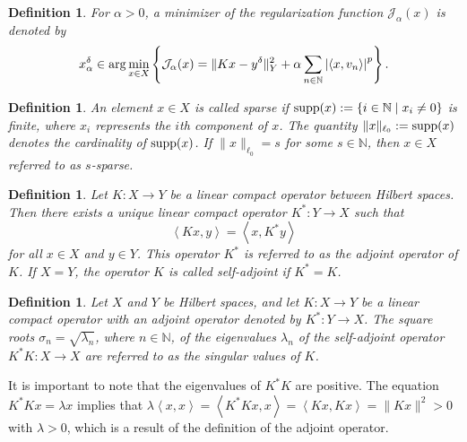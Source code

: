 \documentclass[a4paper,12pt]{article}
\newtheorem{definition}[theorem]{Definition}
\numberwithin{equation}{section}
\begin{document}
\begin{definition}\label{def2.1}
    For $\alpha>0$, a minimizer of the regularization function $\mathcal{J}_{\alpha}(x)$ is denoted by
    \begin{equation*}
    x_{\alpha}^{\delta}\in {\rm arg}\min_{x\in X}\left\{\mathcal{J}_{\alpha}(x)= \|Kx-y^{\delta}\|_{Y}^{2}+\alpha\sum_{n\in\mathbb{N}}\left|\left<x,v_{n}\right>\right|^{p}\right\}.
    \end{equation*}
\end{definition}

\begin{definition}\label{def2.2}
    An element $x\in X$ is called sparse if ${\rm supp}(x):=\left\{i\in\mathbb{N} \mid x_{i}\neq 0\right\}$ is finite, where $x_{i}$ represents the $i${\rm th} component of $x$. The quantity $\|x\|_{\ell_{0}}:={\rm supp}(x)$ denotes the cardinality of ${\rm supp}(x)$. If $\|x\|_{\ell_{0}}=s$ for some $s\in\mathbb{N}$, then $x\in X$ referred to as $s$-sparse.
\end{definition}

\begin{definition}\label{def2.3}
    Let $K:X\rightarrow Y$ be a linear compact operator between Hilbert spaces. Then there exists a unique linear compact operator $K^{*}:Y\rightarrow X$ such that
    \begin{equation*}
        \left<Kx,y\right>=\left<x,K^{*}y\right>
    \end{equation*}
    for all $x\in X$ and $y\in Y$. This operator $K^{*}$ is referred to as the adjoint operator of $K$. If $X=Y$, the operator $K$ is called self-adjoint if $K^{*}=K$.
\end{definition}

\begin{definition}\label{def2.4}
    Let $X$ and $Y$ be Hilbert spaces, and let $K:X\rightarrow Y$ be a linear compact operator with an adjoint operator denoted by $K^{*}:Y\rightarrow X$. The square roots $\sigma_{n}=\sqrt{\lambda_{n}}$, where $n\in\mathbb{N}$, of the eigenvalues $\lambda_{n}$ of the self-adjoint operator $K^{*}K:X\rightarrow X$ are referred to as the singular values of $K$.
\end{definition}

\par It is important to note that the eigenvalues of $K^{*}K$ are positive. The equation $K^{*}Kx=\lambda x$ implies that $\lambda\left<x,x\right>=\left<K^{*}Kx,x\right>=\left<Kx,Kx\right>=\|Kx\|^{2}> 0$ with $\lambda>0$, which is a result of the definition of the adjoint operator.
\end{document}
